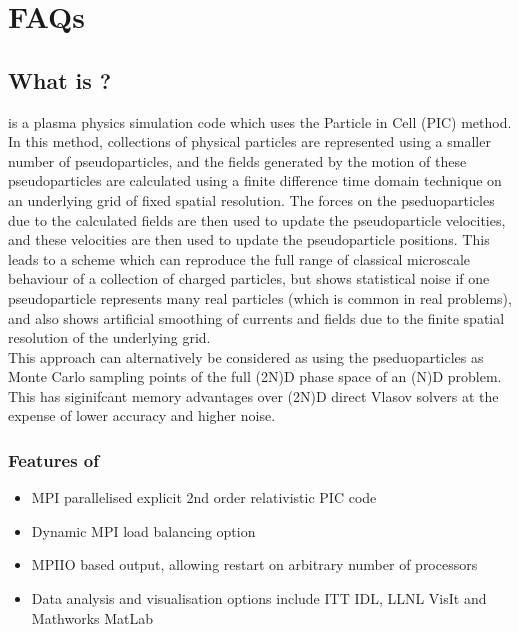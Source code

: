 \documentclass[12pt,a4paper]{article}
\newcommand{\EPOCH}{{\color{warwickdark}\fontfamily{phv}\selectfont{EPOCH}}}
\begin{document}
{
  \selectfont
}
\selectfont%
\tableofcontents%
\newpage%
\DefineShortVerb{\#}
\section{FAQs}

\subsection{What is \EPOCH?}
{\EPOCH} is a plasma physics simulation code which uses the Particle in Cell (PIC)
method. In this method, collections of physical particles are represented using
a smaller number of pseudoparticles, and the fields generated by the motion of
these pseudoparticles are calculated using a finite difference time domain
technique on an underlying grid of fixed spatial resolution. The forces on the
pseduoparticles due to the calculated fields are then used to update the
pseudoparticle velocities, and these velocities are then used to update the
pseudoparticle positions. This leads to a scheme which can reproduce the full
range of classical microscale behaviour of a collection of charged particles,
but shows statistical noise if one pseudoparticle represents many real
particles (which is common in real problems), and also shows artificial
smoothing of currents and fields due to the finite spatial resolution of the
underlying grid.\\

This approach can alternatively be considered as using the pseduoparticles as
Monte Carlo sampling points of the full (2N)D phase space of an (N)D
problem. This has siginifcant memory advantages over (2N)D direct Vlasov
solvers at the expense of lower accuracy and higher noise.

\subsubsection{Features of {\EPOCH}}
\begin{itemize}
  \item MPI parallelised explicit 2nd order relativistic PIC code
  \item Dynamic MPI load balancing option
  \item MPIIO based output, allowing restart on arbitrary number of processors
  \item Data analysis and visualisation options include ITT IDL, LLNL VisIt
    and Mathworks MatLab
\end{itemize}
\end{document}

